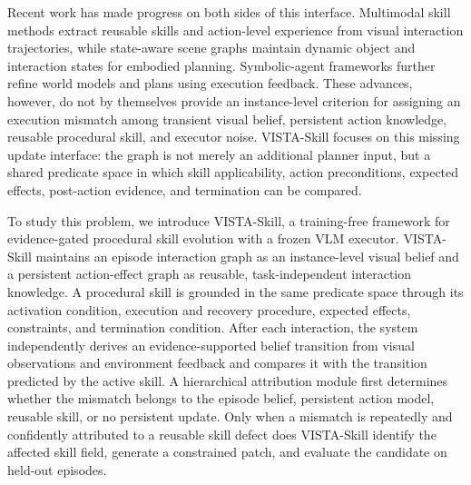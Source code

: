 Recent work has made progress on both sides of this interface. Multimodal skill methods extract reusable skills and action-level experience from visual interaction trajectories, while state-aware scene graphs maintain dynamic object and interaction states for embodied planning. Symbolic-agent frameworks further refine world models and plans using execution feedback. These advances, however, do not by themselves provide an instance-level criterion for assigning an execution mismatch among transient visual belief, persistent action knowledge, reusable procedural skill, and executor noise. VISTA-Skill focuses on this missing update interface: the graph is not merely an additional planner input, but a shared predicate space in which skill applicability, action preconditions, expected effects, post-action evidence, and termination can be compared.



To study this problem, we introduce VISTA-Skill, a training-free framework for evidence-gated procedural skill evolution with a frozen VLM executor. VISTA-Skill maintains an episode interaction graph as an instance-level visual belief and a persistent action-effect graph as reusable, task-independent interaction knowledge. A procedural skill is grounded in the same predicate space through its activation condition, execution and recovery procedure, expected effects, constraints, and termination condition. After each interaction, the system independently derives an evidence-supported belief transition from visual observations and environment feedback and compares it with the transition predicted by the active skill. A hierarchical attribution module first determines whether the mismatch belongs to the episode belief, persistent action model, reusable skill, or no persistent update. Only when a mismatch is repeatedly and confidently attributed to a reusable skill defect does VISTA-Skill identify the affected skill field, generate a constrained patch, and evaluate the candidate on held-out episodes.



